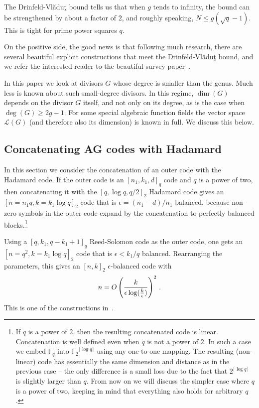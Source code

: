 \documentclass[10pt]{article}
\theoremstyle{definition}
\numberwithin{equation}{section}
\newcommand{\Fq}{{\mathbb{F}_q}}
\newcommand{\Ftwo}{{\mathbb{F}_2}}
\newcommand{\cL}{\mathcal{L}}
\newcommand{\eps}{\epsilon}
\begin{document}
The Drinfeld-Vl\u{a}du\c{t} bound tells us that when $g$ tends to
infinity, the bound can be strengthened by about a factor of $2$,
and roughly speaking, $N \le g (\sqrt{q}-1)$. This is tight for
prime power squares $q$.

On the positive side, the good news %
is that following much
research, there are several beautiful explicit constructions that
meet the Drinfeld-Vl\u{a}du\c{t} bound, and we refer the interested
reader to the beautiful survey paper~\cite[Chapter 1]{GS:06}.

In this paper we look at divisors $G$ whose degree is smaller than
the genus. Much less is known about such small-degree divisors. In
this regime, $\dim(G)$ depends on the divisor $G$ itself, and not
only on its degree, as is the case when $\deg(G) \ge 2g-1$. For some
special algebraic function fields the vector space $\cL(G)$ (and
therefore also its dimension) is known in full. We discuss this
below.


\subsection{Concatenating AG codes with Hadamard}
\label{sec:hadamard}
In this section we consider the concatenation of an outer code with the Hadamard code.
If the outer code is an $[n_1,k_1,d]_q$ code and $q$ is a power of two, then
concatenating it with the $[q,\log q,q/2]_2$ Hadamard code gives an
$[n=n_1 q, k=k_1 \log q]_2$ code that is $\eps={(n_1-d)}/{n_1}$
balanced, because non-zero symbols in the outer code expand by the
concatenation to perfectly balanced blocks.\footnote{If $q$ is a
power of $2$, then the resulting concatenated code is linear.
Concatenation is well defined even when $q$ is not a power of $2$.
In such a case we embed $\Fq$ into $\Ftwo^{\lceil \log q \rceil}$
using any one-to-one mapping. The resulting (non-linear) code has
essentially the same dimension and distance as in the previous case
-- the only difference is a small loss due to the fact that
$2^{\lceil \log q \rceil}$ is slightly larger than $q$. {}From now on
we will discuss the simpler case where $q$ is a power of two,
keeping in mind that everything also holds for arbitrary $q$.}
%

Using a $[q,k_1,q-k_1+1]_q$ Reed-Solomon code as the outer code, one
gets an $[n=q^2,k=k_1 \log q]_2$ code that is $\eps <{k_1}/{q}$
balanced. Rearranging the parameters, this gives an $[n,k]_2$
$\eps$-balanced code with
\begin{equation}\label{eq:aghp-params}
    n=O \left({k \over \eps \log (\frac{k}{\eps})} \right)^2\,.
\end{equation}
This is one of the constructions in~\cite{AGHP:92}.
\end{document}

